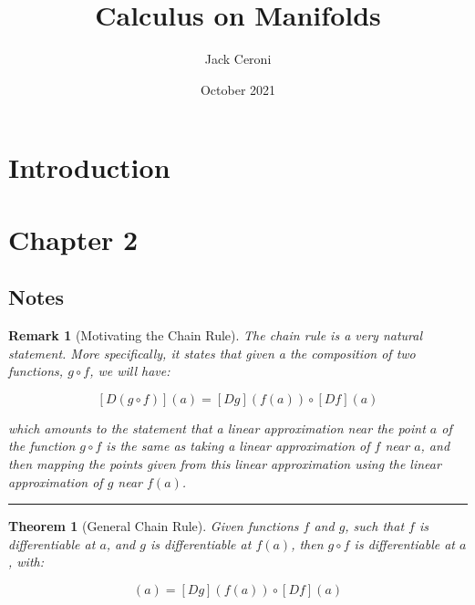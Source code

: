 \documentclass[10pt, oneside]{amsart}
\title{Calculus on Manifolds}
\author{Jack Ceroni}
\date{October 2021}
\newcommand{\vs}{\vspace{0.1pt}}
\newcommand{\hl}{\vspace{4pt} \hrule \vspace{4pt}}
\newtheorem{thm}{Theorem}
\newtheorem{rem}{Remark}
\begin{document}
    \maketitle

    \tableofcontents

    \vspace{.25in}

    \newpage

    \section{Introduction}

    \section{Chapter 2}

    \subsection{Notes}

    \begin{rem}[Motivating the Chain Rule]
      The chain rule is a very natural statement. More specifically, it states that given a the composition of two functions, $g \circ f$, we will have:

      $$[D(g \circ f)](a) = [Dg](f(a)) \circ [Df](a)$$
      \vs

      which amounts to the statement that a linear approximation near the point $a$ of the function $g \circ f$ is the same as taking a linear approximation
      of $f$ near $a$, and then mapping the points given from this linear approximation using the linear approximation of $g$ near $f(a)$.
    \end{rem}

    \hl

    \begin{thm}[General Chain Rule]
      Given functions $f$ and $g$, such that $f$ is differentiable at $a$, and $g$ is differentiable at $f(a)$, then $g \circ f$ is differentiable at $a$, with:

      \begin{equation}
        [D(g \circ f)](a) = [Dg](f(a)) \circ [Df](a)
        \end{equation}
    \end{thm}

    \vspace{1pt}
\end{document}
